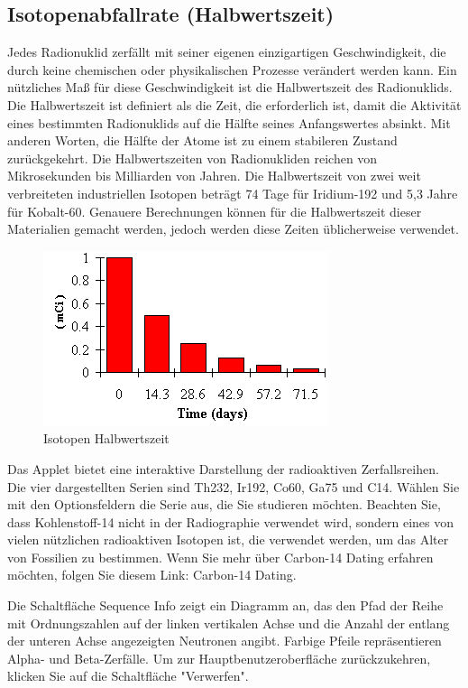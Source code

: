 \subsection{Isotopenabfallrate (Halbwertszeit)}
Jedes Radionuklid zerfällt mit seiner eigenen einzigartigen Geschwindigkeit, die durch keine chemischen oder physikalischen Prozesse verändert werden kann. Ein nützliches Maß für diese Geschwindigkeit ist die Halbwertszeit des Radionuklids. Die Halbwertszeit ist definiert als die Zeit, die erforderlich ist, damit die Aktivität eines bestimmten Radionuklids auf die Hälfte seines Anfangswertes absinkt. Mit anderen Worten, die Hälfte der Atome ist zu einem stabileren Zustand zurückgekehrt. Die Halbwertszeiten von Radionukliden reichen von Mikrosekunden bis Milliarden von Jahren. Die Halbwertszeit von zwei weit verbreiteten industriellen Isotopen beträgt 74 Tage für Iridium-192 und 5,3 Jahre für Kobalt-60. Genauere Berechnungen können für die Halbwertszeit dieser Materialien gemacht werden, jedoch werden diese Zeiten üblicherweise verwendet.
\begin{figure}[htb]
  \centering  
  \includegraphics[scale=0.9]{img/halbwertszeit.png}
  \caption{Isotopen Halbwertszeit}
  \label{fig:halbwertszeit}
\end{figure}
Das Applet bietet eine interaktive Darstellung der radioaktiven Zerfallsreihen. Die vier dargestellten Serien sind Th232, Ir192, Co60, Ga75 und C14. Wählen Sie mit den Optionsfeldern die Serie aus, die Sie studieren möchten. Beachten Sie, dass Kohlenstoff-14 nicht in der Radiographie verwendet wird, sondern eines von vielen nützlichen radioaktiven Isotopen ist, die verwendet werden, um das Alter von Fossilien zu bestimmen. Wenn Sie mehr über Carbon-14 Dating erfahren möchten, folgen Sie diesem Link: Carbon-14 Dating.

Die Schaltfläche Sequence Info zeigt ein Diagramm an, das den Pfad der Reihe mit Ordnungszahlen auf der linken vertikalen Achse und die Anzahl der entlang der unteren Achse angezeigten Neutronen angibt. Farbige Pfeile repräsentieren Alpha- und Beta-Zerfälle. Um zur Hauptbenutzeroberfläche zurückzukehren, klicken Sie auf die Schaltfläche "Verwerfen".

